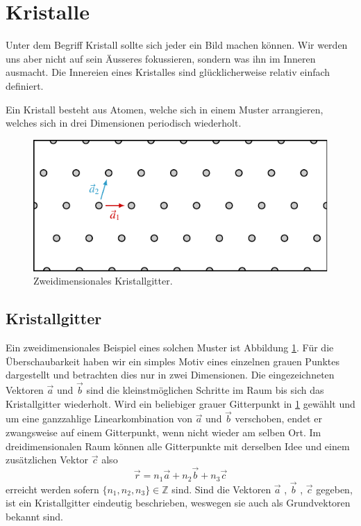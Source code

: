 \section{Kristalle}
Unter dem Begriff Kristall sollte sich jeder ein Bild machen können.
Wir werden uns aber nicht auf sein Äusseres fokussieren, sondern was ihn im Inneren ausmacht.
Die Innereien eines Kristalles sind glücklicherweise relativ einfach definiert.
\begin{definition}[Kristall]
    Ein Kristall besteht aus Atomen, welche sich in einem Muster arrangieren, welches sich in drei Dimensionen periodisch wiederholt.
\end{definition}

\begin{figure}
    \centering
    \includegraphics[]{papers/punktgruppen/figures/lattice}
    \caption{
        Zweidimensionales Kristallgitter.
        \label{fig:punktgruppen:lattice}
    }
\end{figure}
\subsection{Kristallgitter}
Ein zweidimensionales Beispiel eines solchen Muster ist Abbildung \ref{fig:punktgruppen:lattice}.
Für die Überschaubarkeit haben wir ein simples Motiv eines einzelnen grauen Punktes dargestellt und betrachten dies nur in zwei Dimensionen.
Die eingezeichneten Vektoren \(\vec{a}\) und \(\vec{b}\) sind die kleinstmöglichen Schritte im Raum bis sich das Kristallgitter wiederholt.
Wird ein beliebiger grauer Gitterpunkt in \ref{fig:punktgruppen:lattice} gewählt und um eine ganzzahlige Linearkombination von \(\vec{a}\) und \(\vec{b}\) verschoben, endet er zwangsweise auf einem Gitterpunkt, wenn nicht wieder am selben Ort.
Im dreidimensionalen Raum können alle Gitterpunkte mit derselben Idee und einem zusätzlichen Vektor \(\vec{c}\) also
\[
    \vec{r} = n_1 \vec{a} + n_2 \vec{b} + n_3 \vec{c}
\]
erreicht werden sofern $\{n_1,n_2,n_3\} \in \mathbb{Z}$ sind.
Sind die Vektoren  $\vec{a}$ , $\vec{b}$ , $\vec{c}$ gegeben,
ist ein Kristallgitter eindeutig beschrieben, weswegen sie auch als Grundvektoren bekannt sind.

